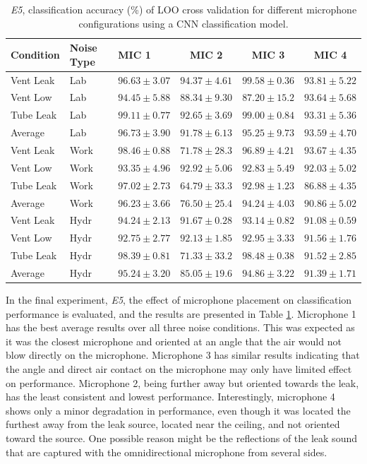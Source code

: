 \begin{table}[H]
    \centering
    \caption{\textit{E5}, classification accuracy (\%) of LOO cross validation for different microphone configurations using a CNN classification model.}
    \begin{tabular}{l l l c c c}
    \toprule
    Condition & Noise Type & MIC 1 & MIC 2 & MIC 3 & MIC 4 \\ \midrule
    
    Vent Leak & Lab & $96.63\pm3.07$ & $94.37\pm4.61$ & $99.58\pm0.36$ & $93.81\pm5.22$\\
    Vent Low  & Lab & $94.45\pm5.88$ & $88.34\pm9.30$ & $87.20\pm15.2$ & $93.64\pm5.68$\\ 
    Tube Leak & Lab & $99.11\pm0.77$ & $92.65\pm3.69$ & $99.00\pm0.84$ & $93.31\pm5.36$\\ \midrule
    Average   & Lab & $96.73\pm3.90$ & $91.78\pm6.13$ & $95.25\pm9.73$ & $93.59\pm4.70$ \\ \midrule
    
    Vent Leak & Work & $98.46\pm0.88$ & $71.78\pm28.3$ & $96.89\pm4.21$ & $93.67\pm4.35$ \\
    Vent Low  & Work & $93.35\pm4.96$ & $92.92\pm5.06$ & $92.83\pm5.49$ & $92.03\pm5.02$\\ 
    Tube Leak & Work & $97.02\pm2.73$ & $64.79\pm33.3$ & $92.98\pm1.23$ & $86.88\pm4.35$ \\ \midrule
    Average   & Work & $96.23\pm3.66$ & $76.50\pm25.4$ & $94.24\pm4.03$ & $90.86\pm5.02$ \\ \midrule
    
    Vent Leak & Hydr & $94.24\pm2.13$ & $91.67\pm0.28$ & $93.14\pm0.82$ & $91.08\pm0.59$ \\
    Vent Low  & Hydr & $92.75\pm2.77$ & $92.13\pm1.85$ & $92.95\pm3.33$ & $91.56\pm1.76$\\ 
    Tube Leak & Hydr & $98.39\pm0.81$ & $71.33\pm33.2$ & $98.48\pm0.38$ & $91.52\pm2.85$\\ \midrule
    Average   & Hydr & $95.24\pm3.20$ & $85.05\pm19.6$ & $94.86\pm3.22$ & $91.39\pm1.71$\\ 
    
\bottomrule
    \end{tabular}
	\label{tab:mic-logo}
\end{table}

In the final experiment, \textit{E5}, the effect of microphone placement on classification performance is evaluated, and the results are presented in Table \ref{tab:mic-logo}. Microphone 1 has the best average results over all three noise conditions. This was expected as it was the closest microphone and oriented at an angle that the air would not blow directly on the microphone. Microphone 3 has similar results indicating that the angle and direct air contact on the microphone may only have limited effect on performance. Microphone 2, being further away but oriented towards the leak, has the least consistent and lowest performance. Interestingly, microphone 4 shows only a minor degradation in performance, even though it was located the furthest away from the leak source, located near the ceiling, and not oriented toward the source. One possible reason might be the reflections of the leak sound that are captured with the omnidirectional microphone from several sides.